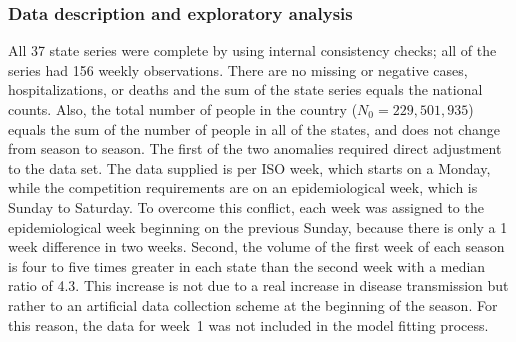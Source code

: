 \documentclass[12pt,a4paper]{article}
\theoremstyle{definition}
\theoremstyle{remark}
\begin{document}
\subsubsection{Data description and exploratory analysis}

All 37 state series were complete by using internal consistency checks; all of the series had 156 weekly observations. There are no missing or negative cases, hospitalizations, or deaths and the sum of the state series equals the national counts. Also, the total number of people in the country ($N_0 = 229{,}501{,}935$) equals the sum of the number of people in all of the states, and does not change from season to season.
The first of the two anomalies required direct adjustment to the data set. The data supplied is per ISO week, which starts on a Monday, while the competition requirements are on an epidemiological week, which is Sunday to Saturday. To overcome this conflict, each week was assigned to the epidemiological week beginning on the previous Sunday, because there is only a 1 week difference in two weeks. Second, the volume of the first week of each season is four to five times greater in each state than the second week with a median ratio of 4.3. This increase is not due to a real increase in disease transmission but rather to an artificial data collection scheme at the beginning of the season. For this reason, the data for week~1 was not included in the model fitting process.



\end{document}
